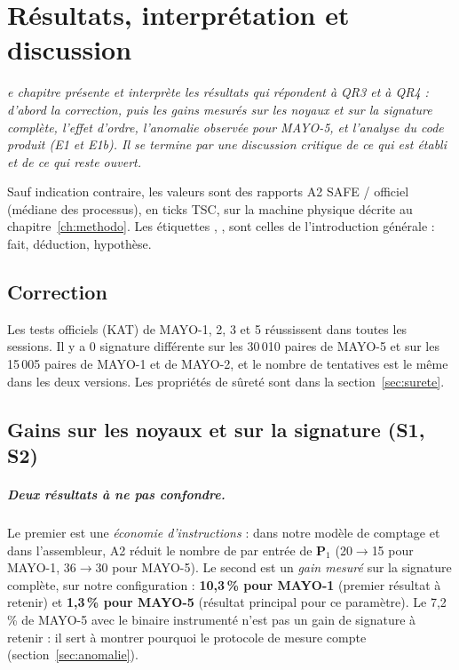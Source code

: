 \let\textcircled=\pgftextcircled
\chapter[Résultats et discussion]{Résultats, interprétation et discussion}
\label{ch:resultats}

\minitoc
\bigskip

\textit{e chapitre présente et interprète les résultats qui répondent à QR3 et à QR4 : d'abord la correction, puis les gains mesurés sur les noyaux et sur la signature complète, l'effet d'ordre, l'anomalie observée pour MAYO-5, et l'analyse du code produit (E1 et E1b). Il se termine par une discussion critique de ce qui est établi et de ce qui reste ouvert.}

\newpage


Sauf indication contraire, les valeurs sont des rapports A2 SAFE / officiel (médiane des processus), en ticks TSC, sur la machine physique décrite au chapitre~\ref{ch:methodo}. Les étiquettes \F{}, \I{}, \Hy{} sont celles de l'introduction générale : \F{} fait, \I{} déduction, \Hy{} hypothèse.

\section{Correction}
\F{} Les tests officiels (KAT) de MAYO-1, 2, 3 et 5 réussissent dans toutes les sessions. Il y a 0 signature différente sur les 30\,010 paires de MAYO-5 et sur les 15\,005 paires de MAYO-1 et de MAYO-2, et le nombre de tentatives est le même dans les deux versions. Les propriétés de sûreté sont dans la section~\ref{sec:surete}.

\section{Gains sur les noyaux et sur la signature (S1, S2)}
\paragraph{Deux résultats à ne pas confondre.} Le premier est une \emph{économie d'instructions} : dans notre modèle de comptage et dans l'assembleur, A2 réduit le nombre de  par entrée de $\mathbf{P}_1$ (20$\to$15 pour MAYO-1, 36$\to$30 pour MAYO-5). Le second est un \emph{gain mesuré} sur la signature complète, sur notre configuration : \textbf{10,3\,\% pour MAYO-1} (premier résultat à retenir) et \textbf{1,3\,\% pour MAYO-5} (résultat principal pour ce paramètre). Le 7,2\,\% de MAYO-5 avec le binaire instrumenté n'est pas un gain de signature à retenir : il sert à montrer pourquoi le protocole de mesure compte (section~\ref{sec:anomalie}).

